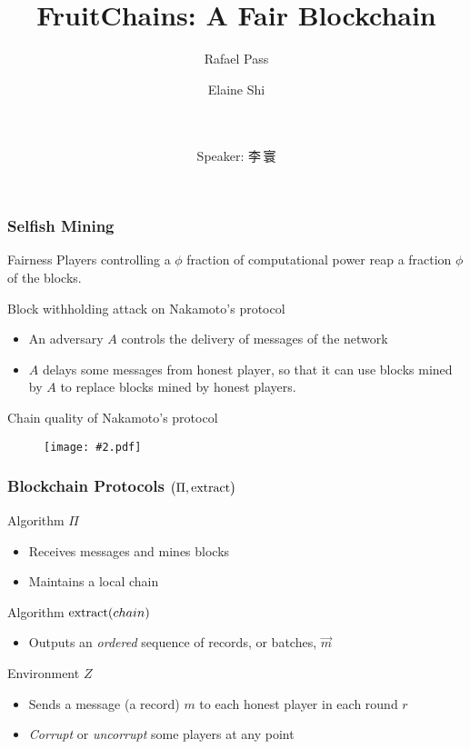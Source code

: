 \documentclass{beamer}
\title{FruitChains: A Fair Blockchain}
\author{Rafael Pass\inst{1} \and Elaine Shi\inst{2}}
\date{
\\ \quad \\ Speaker:\quad
李\,寰 \vspace{-25pt}
}
\institute[Cornell University] %
{
  \inst{1}%
  Department of Computer Science\\
  Cornell Tech
  \and
  \inst{2}%
  Department of Computer Science\\
  Cornell University
}
\newcommand{\insfig}[2][1]{
	\begin{figure}
		\texttt{[image: \#2.pdf]}
	\end{figure}
}
\begin{document}
\begin{spacing}{1.2}

\frame{\titlepage}
\note{
	\vspace{70pt}
	\Huge{\centerline{\LaTeX}}
}


\begin{frame}
	\frametitle{Selfish Mining}
	\begin{block}{Fairness}
		Players controlling a $\phi$ fraction of computational power reap a fraction $\phi$ of the blocks.
	\end{block}
	\begin{block}{Block withholding attack on Nakamoto's protocol}
		\begin{itemize}
			\item An adversary $A$ controls the delivery of messages of the network
			\item $A$ delays some messages from honest player, so that 
it can use blocks mined by $A$ to replace blocks mined by honest players.
		\end{itemize}
	\end{block}
	\begin{block}{Chain quality of Nakamoto's protocol}
		\insfig{BWA}
	\end{block}
\end{frame}

\begin{frame}
	\frametitle{Blockchain Protocols $\big(\Pi, {\rm extract}\big)$}
	\vspace{-3pt}
	\begin{block}{Algorithm $\Pi$}
		\begin{itemize}
			\item Receives messages and mines blocks
			\item Maintains a local chain
		\end{itemize}
	\end{block}
	\begin{block}{Algorithm ${\rm extract}(chain)$}
		\begin{itemize}
			\item Outputs an \textit{ordered} sequence of records, or batches, $\vec{m}$ 
		\end{itemize}
	\end{block}
	
	\begin{block}{Environment $Z$}
		\begin{itemize}
			\item Sends a message (a record) $m$ to each honest player in each round $r$
			\item \textit{Corrupt} or \textit{uncorrupt} some players at any point
		\end{itemize}
	\end{block}
	

\end{frame}
\end{spacing}
\end{document}
